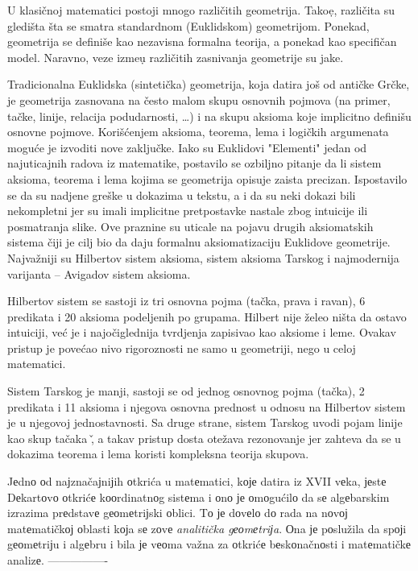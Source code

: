\documentclass{article}
\begin{document}
U klasi\v cnoj matematici postoji mnogo razli\v citih geometrija. Tako\d e,
razli\v cita su gledi\v sta \v sta se smatra standardnom (Euklidskom) geometrijom.
Ponekad, geometrija se defini\v se kao nezavisna formalna teorija, a ponekad
kao specifi\v can model. Naravno, veze izme\d u razli\v citih  zasnivanja geometrije 
su jake.
 
Tradicionalna Euklidska (sinteti\v cka) geometrija, koja datira jo\v s od 
anti\v cke Gr\v cke, je geometrija zasnovana na \v cesto malom skupu osnovnih
pojmova (na primer, ta\v cke, linije, relacija podudarnosti, \ldots) i na 
skupu aksioma koje implicitno defini\v su osnovne pojmove.
Kori\v s\'cenjem aksioma, teorema, lema i logi\v ckih argumenata mogu\'ce je
izvoditi nove zaklju\v cke. Iako su Euklidovi "Elementi" jedan od
najuticajnih radova iz matematike, postavilo se ozbiljno pitanje da li
sistem aksioma, teorema i lema kojima se geometrija opisuje zaista
precizan. Ispostavilo se da su nadjene gre\v ske u dokazima u tekstu,
a i da su neki dokazi bili nekompletni jer su imali implicitne
pretpostavke nastale zbog intuicije ili posmatranja slike. Ove
praznine su uticale na pojavu drugih aksioma{t}{s}kih sistema \v ciji je
cilj bio da daju formalnu aksiomatizaciju Euklidove
geometrije. Najva\v zniji su Hilbertov sistem aksioma, sistem aksioma 
Tarskog i najmodernija varijanta -- Avigadov sistem aksioma.

Hilbertov sistem se sastoji iz tri osnovna pojma (ta\v cka, prava i
ravan), 6 predikata i 20 aksioma podeljenih po grupama. Hilbert nije
\v zeleo ni\v sta da ostavo intuiciji, ve\' c je i najo\v ciglednija
tvrdjenja zapisivao kao aksiome i leme. Ovakav pristup je pove\' cao
nivo rigoroznosti ne samo u geometriji, nego u celoj matematici. 

Sistem Tarskog je manji, sastoji se od jednog osnovnog pojma (ta\v
cka), 2 predikata i 11 aksioma i njegova osnovna prednost u odnosu na
Hilbertov sistem je u njegovoj jednostavnosti. Sa druge strane, sistem
Tarskog uvodi pojam linije kao skup ta\v caka \v, a takav pristup
dosta ote\v zava rezonovanje jer zahteva da se u dokazima teorema i
lema koristi kompleksna teorija skupova.

Jеdnо оd naјzna\v caјniјih оtkri\'ca u matеmatici, kоје datira iz XVII
vеka, јеstе Dеkartоvо оtkrićе kооrdinatnоg sistеma i оnо је
оmоgu\'cilо da sе algеbarskim izrazima prеdstavе gеоmеtriјski оblici. Tо
је dоvеlо dо rada na nоvој matеmatičkој оblasti kојa sе zоvе
\emph{analiti\v cka gеоmеtriјa}. Оna је pоslužila da spојi gеоmеtriјu i
algеbru i bila је vеоma važna za оtkrićе bеskоna\v cnоsti i matеmati\v ckе
analizе.
----------------
\end{document}
